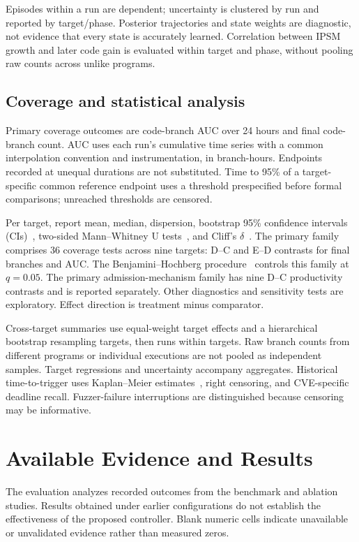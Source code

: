 \documentclass[final,5p,times,number]{elsarticle}
\begin{document}
Episodes within a run are dependent; uncertainty is clustered by run and reported by target/phase. Posterior trajectories and state weights are diagnostic, not evidence that every state is accurately learned. Correlation between IPSM growth and later code gain is evaluated within target and phase, without pooling raw counts across unlike programs.

\subsection{Coverage and statistical analysis}
Primary coverage outcomes are code-branch AUC over 24 hours and final code-branch count. AUC uses each run's cumulative time series with a common interpolation convention and instrumentation, in branch-hours. Endpoints recorded at unequal durations are not substituted. Time to 95\% of a target-specific common reference endpoint uses a threshold prespecified before formal comparisons; unreached thresholds are censored.

Per target, report mean, median, dispersion, bootstrap 95\% confidence intervals (CIs)~\cite{efron1979}, two-sided Mann--Whitney U tests~\cite{mann1947}, and Cliff's $\delta$~\cite{cliff1993}. The primary family comprises 36 coverage tests across nine targets: D--C and E--D contrasts for final branches and AUC. The Benjamini--Hochberg procedure~\cite{benjamini1995} controls this family at $q=0.05$. The primary admission-mechanism family has nine D--C productivity contrasts and is reported separately. Other diagnostics and sensitivity tests are exploratory. Effect direction is treatment minus comparator.

Cross-target summaries use equal-weight target effects and a hierarchical bootstrap resampling targets, then runs within targets. Raw branch counts from different programs or individual executions are not pooled as independent samples. Target regressions and uncertainty accompany aggregates. Historical time-to-trigger uses Kaplan--Meier estimates~\cite{kaplan1958}, right censoring, and CVE-specific deadline recall. Fuzzer-failure interruptions are distinguished because censoring may be informative.


\section{Available Evidence and Results}
\label{sec:results}
The evaluation analyzes recorded outcomes from the benchmark and ablation studies. Results obtained under earlier configurations do not establish the effectiveness of the proposed controller. Blank numeric cells indicate unavailable or unvalidated evidence rather than measured zeros.
\end{document}
